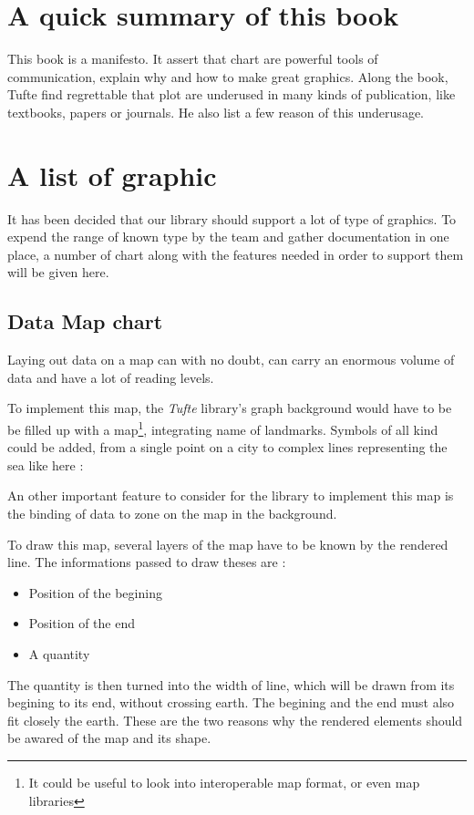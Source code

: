 \section{A quick summary of this book}
This book is a manifesto. It assert that chart are powerful tools of communication, explain why and how to make great graphics.
Along the book, Tufte find regrettable that plot are underused in many kinds of publication, like textbooks, papers or journals. He also list a few reason of this underusage.

\section{A list of graphic}
It has been decided that our library should support a lot of type of graphics. To expend the range of known type by the team and gather documentation in one place, a number of chart along with the features needed in order to support them will be given here.

\subsection{Data Map chart}
Laying out data on a map can with no doubt, can carry an enormous volume of data and have a lot of reading levels.

To implement this map, the \textit{Tufte} library's graph background would have to be be filled up with a map\footnote{It could be useful to look into interoperable map format, or even map libraries}, integrating name of landmarks. Symbols of all kind could be added, from a single point on a city to complex lines representing the sea like here :

An other important feature to consider for the library to implement this map is the binding of data to zone on the map in the background.

To draw this map, several layers of the map have to be known by the rendered line. The informations passed to draw theses are :
\begin{itemize}
\item Position of the begining
\item Position of the end
\item A quantity
\end{itemize}
The quantity is then turned into the width of line, which will be drawn from its begining to its end, without crossing earth.
The begining and the end must also fit closely the earth. These are the two reasons why the rendered elements should be awared of the map and its shape.

